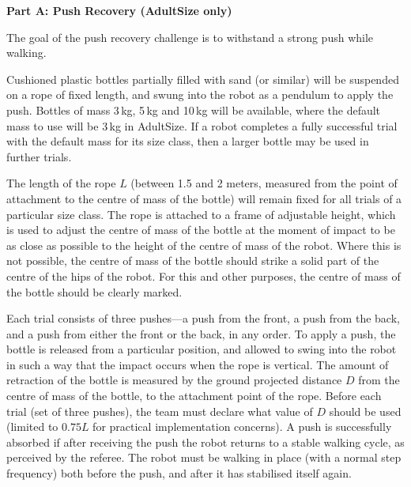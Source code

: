 \clearpage
\sffamily
{\bfseries\color[rgb]{0.4,0.4,0.4}
Part A: Push Recovery (AdultSize only)}
{}


\bigskip

The goal of the push recovery challenge is to withstand a strong push while walking. 

Cushioned plastic bottles partially filled with sand (or similar) will be
suspended on a rope of fixed length,
and swung into the robot as a pendulum to apply the push.
Bottles of mass 3$\,$kg, 5$\,$kg
and 10$\,$kg will be available,
where the default mass to use will be 3$\,$kg in AdultSize.
If a robot completes a fully successful trial with the default mass for its size
class, then a larger bottle may be used in further trials.

\medskip
The length of the rope $L$ (between 1.5 and 2 meters, measured from the point of 
attachment to the centre of mass of the bottle) will remain fixed for all trials 
of a particular size class.
The rope is attached to a frame of adjustable height,
which is used to adjust the centre of mass of the bottle at the moment of impact
to be as close as possible to the height of the centre of mass of the robot.
Where this is not possible, the centre of mass of the bottle should strike a solid part
of the centre of the hips of the robot.
For this and other purposes, the centre of mass of the bottle should be clearly marked.

\medskip
Each trial consists of three pushes---a push from the front, a push from the back, and a push from either the front or the back, in any order. To apply a push, the bottle is released from a particular position, and allowed to swing into the robot in such a way that the impact occurs when the rope is vertical. The amount of retraction of the bottle is measured by the ground projected distance $D$ from the centre of mass of the bottle, to the attachment point of the rope. Before each trial (set of three pushes), the team must declare what value of $D$ should be used (limited to $0.75L$ for practical implementation concerns). A push is successfully absorbed if after receiving the push the robot 
returns to a stable walking cycle, as perceived by the referee. The robot must be walking in place (with a normal step frequency) both before the push, and after it has stabilised itself again.

